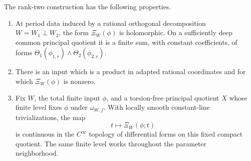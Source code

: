 \begin{proposition}\label{prop:theta-top}
The rank-two construction has the following properties.
\begin{enumerate}[label=(\roman*)]
\item At period data induced by a rational orthogonal
  decomposition \(W=W_1\perp W_2\), the form \(\Xi_W(\phi)\)
  is holomorphic.  On a sufficiently deep common principal
  quotient it is a finite sum, with constant coefficients, of
  forms \(\Theta_1(\phi_{1,r})\wedge\Theta_2(\phi_{2,r})\).
\item There is an input which is a product in adapted rational
  coordinates and for which \(\Xi_W(\phi)\) is nonzero.
\item Fix \(W\), the total finite input \(\phi\), and a
  torsion-free principal quotient \(X\) whose finite level fixes
  \(\phi\) under \(\omega_{W,f}\).  With locally smooth
  constant-line trivializations, the map
  \[
    t\longmapsto\Xi_W(\phi;t)
  \]
  is continuous in the \(C^\infty\) topology of differential
  forms on this fixed compact quotient.  The same finite level
  works throughout the parameter neighborhood.
\end{enumerate}
\end{proposition}

